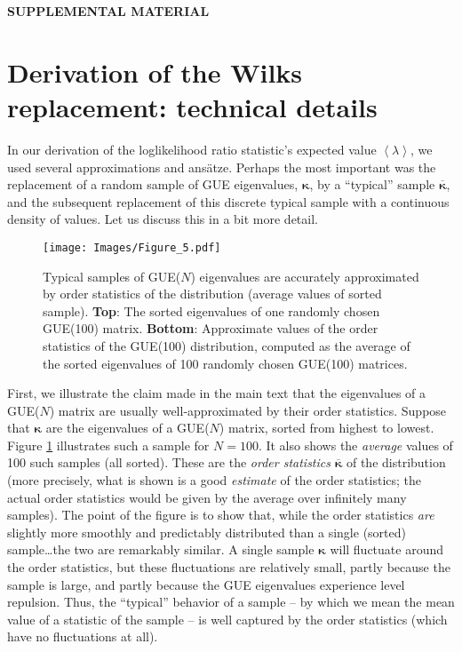 \documentclass[aps,pra, twocolumn]{revtex4}
\newcommand{\expect}[1]{\ensuremath{\left\langle#1\right\rangle}}
\newcommand{\bvec}[1]{\boldsymbol{#1}}
\begin{document}
\newpage
\newpage

\begin{center}\textbf{SUPPLEMENTAL MATERIAL}\end{center}

\section{Derivation of the Wilks replacement: technical details}
\label{app:technical}

In our derivation of the loglikelihood ratio statistic's expected value $\expect{\lambda}$, we used several approximations and ans\"atze.  Perhaps the most important was the replacement of a random sample of GUE eigenvalues, $\bvec{\kappa}$, by a ``typical'' sample $\overline{\bvec{\kappa}}$, and the subsequent replacement of this discrete typical sample with a continuous density of values.  Let us discuss this in a bit more detail.

\begin{figure}[h!]
\texttt{[image: Images/Figure\_5.pdf]}
\caption{Typical samples of GUE($N$) eigenvalues are accurately approximated by order statistics of the distribution (average values of sorted sample).  \textbf{Top}:  The sorted eigenvalues of one randomly chosen GUE(100) matrix.  \textbf{Bottom}:  Approximate values of the order statistics of the GUE(100) distribution, computed as the average of the sorted eigenvalues of 100 randomly chosen GUE(100) matrices.}
\label{fig:orderstatistics1}
\end{figure}

First, we illustrate the claim made in the main text that the eigenvalues of a GUE($N$) matrix are usually well-approximated by their order statistics.  Suppose that $\bvec{\kappa}$ are the eigenvalues of a GUE($N$) matrix, sorted from highest to lowest.  Figure \ref{fig:orderstatistics1} illustrates such a sample for $N=100$.  It also shows the \emph{average} values of 100 such samples (all sorted).  These are the \emph{order statistics} $\overline{\bvec{\kappa}}$ of the distribution (more precisely, what is shown is a good \emph{estimate} of the order statistics; the actual order statistics would be given by the average over infinitely many samples).  The point of the figure is to show that, while the order statistics \emph{are} slightly more smoothly and predictably distributed than a single (sorted) sample\ldots the two are remarkably similar.  A single sample $\bvec{\kappa}$ will fluctuate around the order statistics, but these fluctuations are relatively small, partly because the sample is large, and partly because the GUE eigenvalues experience level repulsion.  Thus, the ``typical'' behavior of a sample -- by which we mean the mean value of a statistic of the sample -- is well captured by the order statistics (which have no fluctuations at all).
\end{document}
